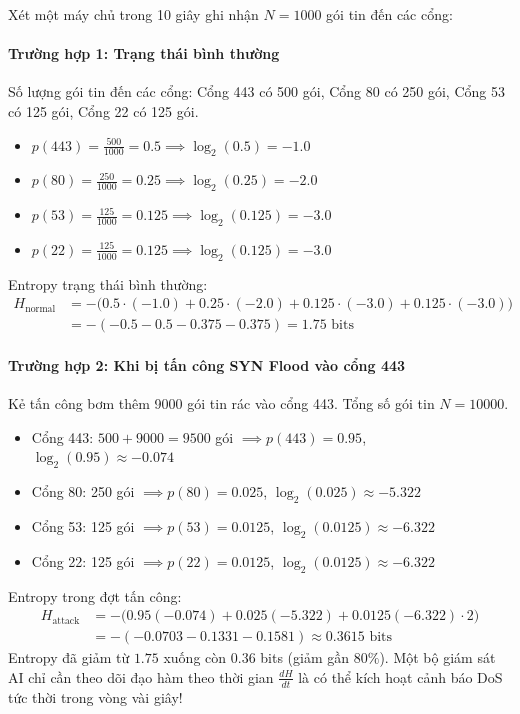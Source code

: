 \begin{example}
Xét một máy chủ trong 10 giây ghi nhận $N = 1000$ gói tin đến các cổng:
\paragraph{Trường hợp 1: Trạng thái bình thường}
Số lượng gói tin đến các cổng: Cổng 443 có 500 gói, Cổng 80 có 250 gói, Cổng 53 có 125 gói, Cổng 22 có 125 gói.
\begin{itemize}
  \item $p(443) = \frac{500}{1000} = 0.5 \implies \log_2(0.5) = -1.0$
  \item $p(80) = \frac{250}{1000} = 0.25 \implies \log_2(0.25) = -2.0$
  \item $p(53) = \frac{125}{1000} = 0.125 \implies \log_2(0.125) = -3.0$
  \item $p(22) = \frac{125}{1000} = 0.125 \implies \log_2(0.125) = -3.0$
\end{itemize}
Entropy trạng thái bình thường:
\begin{align*}
H_{\text{normal}} &= - \Big( 0.5 \cdot (-1.0) + 0.25 \cdot (-2.0) + 0.125 \cdot (-3.0) + 0.125 \cdot (-3.0) \Big) \\
&= - (-0.5 - 0.5 - 0.375 - 0.375) = 1.75 \text{ bits}
\end{align*}

\paragraph{Trường hợp 2: Khi bị tấn công SYN Flood vào cổng 443}
Kẻ tấn công bơm thêm 9000 gói tin rác vào cổng 443. Tổng số gói tin $N = 10000$.
\begin{itemize}
  \item Cổng 443: $500 + 9000 = 9500$ gói $\implies p(443) = 0.95$, $\log_2(0.95) \approx -0.074$
  \item Cổng 80: 250 gói $\implies p(80) = 0.025$, $\log_2(0.025) \approx -5.322$
  \item Cổng 53: 125 gói $\implies p(53) = 0.0125$, $\log_2(0.0125) \approx -6.322$
  \item Cổng 22: 125 gói $\implies p(22) = 0.0125$, $\log_2(0.0125) \approx -6.322$
\end{itemize}
Entropy trong đợt tấn công:
\begin{align*}
H_{\text{attack}} &= - \Big( 0.95(-0.074) + 0.025(-5.322) + 0.0125(-6.322) \cdot 2 \Big) \\
&= - (-0.0703 - 0.1331 - 0.1581) \approx 0.3615 \text{ bits}
\end{align*}
Entropy đã giảm từ $1.75$ xuống còn $0.36$ bits (giảm gần $80\%$). Một bộ giám sát AI chỉ cần theo dõi đạo hàm theo thời gian $\frac{dH}{dt}$ là có thể kích hoạt cảnh báo DoS tức thời trong vòng vài giây!
\end{example}

